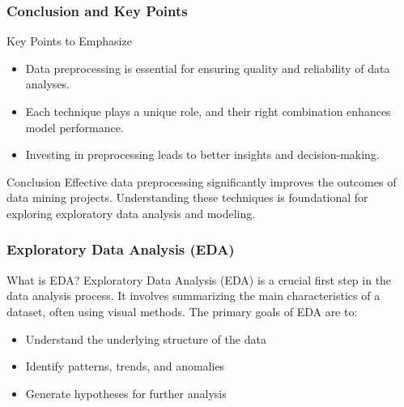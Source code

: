 \documentclass{beamer}
\begin{document}
\begin{frame}[fragile]
    \frametitle{Conclusion and Key Points}
    
    \begin{block}{Key Points to Emphasize}
        \begin{itemize}
            \item Data preprocessing is essential for ensuring quality and reliability of data analyses.
            \item Each technique plays a unique role, and their right combination enhances model performance.
            \item Investing in preprocessing leads to better insights and decision-making.
        \end{itemize}
    \end{block}
    
    \begin{block}{Conclusion}
        Effective data preprocessing significantly improves the outcomes of data mining projects. Understanding these techniques is foundational for exploring exploratory data analysis and modeling.
    \end{block}
\end{frame}

\begin{frame}
    \frametitle{Exploratory Data Analysis (EDA)}
    \begin{block}{What is EDA?}
        Exploratory Data Analysis (EDA) is a crucial first step in the data analysis process. It involves summarizing the main characteristics of a dataset, often using visual methods. The primary goals of EDA are to:
    \end{block}
    \begin{itemize}
        \item Understand the underlying structure of the data
        \item Identify patterns, trends, and anomalies
        \item Generate hypotheses for further analysis
    \end{itemize}
\end{frame}
\end{document}
